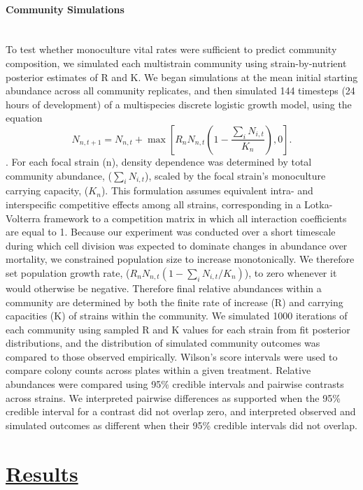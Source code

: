 \paragraph*{Community Simulations}\mbox{}\\
To test whether monoculture vital rates were sufficient to predict community composition, we simulated each multistrain community using strain-by-nutrient posterior estimates of R and K.  We began simulations at the mean initial starting abundance across all community replicates, and then simulated 144 timesteps (24 hours of development) of a multispecies discrete logistic growth model, using the equation 
\begin{equation}
    N_{n,t+1}=N_{n,t}+\max\left[
    R_nN_{n,t}\left(1-\frac{\sum_i N_{i,t}}{K_n}\right), 0
    \right].\label{eq:multispecies}
\end{equation}. 
For each focal strain (n), density dependence was determined by total community abundance, ($\sum_i N_{i,t}$), scaled by the focal strain's monoculture carrying capacity, ($K_n$). This formulation assumes equivalent intra- and interspecific competitive effects among all strains, corresponding in a Lotka-Volterra framework \parencite{volterra1928variations, macarthur1967limiting} to a competition matrix in which all interaction coefficients are equal to 1. Because our experiment was conducted over a short timescale during which cell division was expected to dominate changes in abundance over mortality, we constrained population size to increase monotonically. We therefore set population growth rate, ($R_nN_{n,t}(1-\sum_i N_{i,t}/K_n)$), to zero whenever it would otherwise be negative. Therefore final relative abundances within a community are determined by both the finite rate of increase (R) and carrying capacities (K) of strains within the community. We simulated 1000 iterations of each community using sampled R and K values for each strain from fit posterior distributions, and the distribution of simulated community outcomes was compared to those observed empirically. Wilson's score intervals were used to compare colony counts across plates within a given treatment. Relative abundances were compared using 95\% credible intervals and pairwise contrasts across strains. We interpreted pairwise differences as supported when the 95\% credible interval for a contrast did not overlap zero, and interpreted observed and simulated outcomes as different when their 95\% credible intervals did not overlap.

\section*{\textbf{\underline{Results}}}
